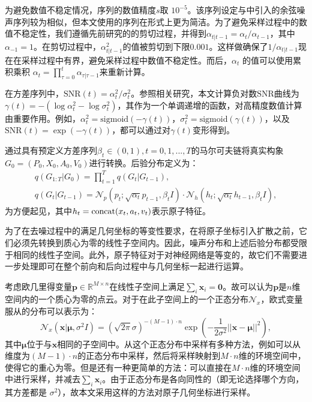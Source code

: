 为避免数值不稳定情况，序列的数值精度$s$取 $10^{-5}$。该序列设定与\cite{impddpm_nichol_21}中引入的余弦噪声序列较为相似，但本文使用的序列在形式上更为简洁。为了避免采样过程中的数值不稳定性，我们遵循先前研究的\cite{impddpm_nichol_21}的剪切过程，并得到$\alpha_{t|t-1} = \alpha_t / \alpha_{t-1}$，其中$\alpha_{-1} = 1$。在剪切过程中，$\alpha_{t|t-1}^2$的值被剪切到下限$0.001$。这样做确保了$1 / \alpha_{t|t-1}$现在在采样过程中有界，避免采样过程中数值不稳定性。而后，$\alpha_t$ 的值可以使用累积乘积 $\alpha_t = \prod_{\tau=0}^t \alpha_{\tau|\tau-1}$来重新计算。

在方差序列中，$\mathrm{SNR}(t) = \alpha_t^2 / \sigma_t^2$。参照相关研究\cite{vaediff_kingma_21}，本文计算负对数$\mathrm{SNR}$曲线为$\gamma(t) = -(\log \alpha_t^2 - \log \sigma_t^2)$，其作为一个单调递增的函数，对高精度数值计算由重要作用。例如，$\alpha_t^2 = \mathrm{sigmoid}(-\gamma(t))$，$\sigma_t^2 = \mathrm{sigmoid}(\gamma(t))$，以及 $\mathrm{SNR}(t) = \exp(-\gamma(t))$，都可以通过对$\gamma(t)$变形得到。

通过具有预定义方差序列$\beta_t \in (0, 1), t=0, 1, ..., T$的马尔可夫链将真实构象$G_0 = (P_0, X_0, A_0, V_0)$进行转换。后验分布定义为：
\begin{eqnarray}
    &q(G_{1:T}|G_0) = \prod^T_{t=1} q(G_t|G_{t-1}),& \\
    &q(G_t|G_{t-1}) = \mathcal{N}_p(p_t;\sqrt{\alpha_t} p_{t-1}, \beta_t I) \cdot \mathcal{N}_h(h_t;\sqrt{\alpha_t} h_{t-1}, \beta_t I),&
\end{eqnarray}
为方便起见，其中$h_t = {\rm concat}(x_t, a_t, v_t)$表示原子特征。

为了在去噪过程中的满足几何坐标的等变性要求，在将原子坐标引入扩散之前，它们必须先转换到质心为零的线性子空间内\cite{enf_satorras_21,edm_hoogeboom_22,geodiff_xu_22}。因此，噪声分布和上述后验分布都受限于相同的线性子空间。此外，原子特征对于对神经网络是等变的，故它们不需要进一步处理即可在整个前向和后向过程中与几何坐标一起进行运算。

考虑欧几里得变量$\mathbf{p} \in \mathbb{R}^{M \times n}$在线性子空间上满足$\sum_i \mathbf{x}_i = \mathbf{0}$。故可以认为$\mathbf{p}$是$n$维空间内的一个质心为零的点云。对于在此子空间上的一个正态分布$\mathcal{N}_x$，欧式变量服从的分布可以表示为：
\begin{equation}
    \mathcal{N}_x(\mathbf{x} | \mathbf{\mu}, \sigma^2 I) = (\sqrt{2 \pi} \sigma)^{-(M-1)\cdot n} \exp \left( -\frac{1}{2\sigma^2} || \mathbf{x} - \mathbf{\mu}||^2 \right),
\end{equation}
其中$\mathbf{\mu}$位于与$\mathbf{x}$相同的子空间中。从这个正态分布中采样有多种方法，例如可以从维度为$(M-1)\cdot n$的正态分布中采样，然后将采样映射到$M\cdot n$维的环境空间中，使得它的重心为零。但是还有一种更简单的方法：可以直接在$M\cdot n$维的环境空间中进行采样，并减去$\sum_i \mathbf{x}_i$。由于正态分布是各向同性的（即无论选择哪个方向，其方差都是 $\sigma^2$），故本文采用这样的方法对原子几何坐标进行采样。

